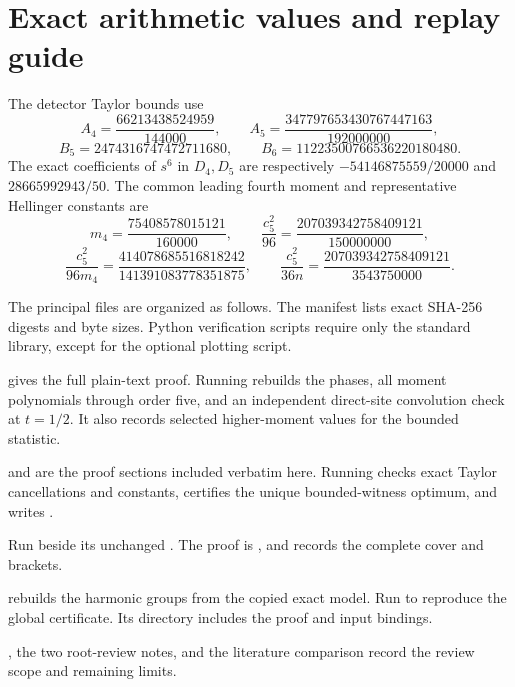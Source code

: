 \documentclass[11pt]{article}
\begin{document}
\appendix
\section{Exact arithmetic values and replay guide}

The detector Taylor bounds use
\[
 A_4=\frac{66213438524959}{144000},\qquad
 A_5=\frac{347797653430767447163}{192000000},
\]
\[
 B_5=2474316747472711680,\qquad
 B_6=11223500766536220180480.
\]
The exact coefficients of $s^6$ in $D_4,D_5$ are respectively
$-54146875559/20000$ and $28665992943/50$.
The common leading fourth moment and representative Hellinger constants are
\[
 m_4=\frac{75408578015121}{160000},\qquad
 \frac{c_5^2}{96}=\frac{207039342758409121}{150000000},
\]
\[
 \frac{c_5^2}{96m_4}=\frac{414078685516818242}{141391083778351875},\qquad
 \frac{c_5^2}{36n}=\frac{207039342758409121}{3543750000}.
\]

The principal files are organized as follows. The manifest lists exact
SHA-256 digests and byte sizes. Python verification scripts require only
the standard library, except for the optional plotting script.
\begin{description}\raggedright
\item[Homogeneous theorem.]
 gives the full
plain-text proof. Running 
rebuilds the phases, all moment polynomials through order five, and an
independent direct-site convolution check at $t=1/2$. It also records
selected higher-moment values for the bounded statistic.
\item[Detectors and optimization.]
 and  are the
proof sections included verbatim here.
Running  checks exact Taylor
cancellations and constants, certifies the unique bounded-witness optimum,
and writes .
\item[Original and marginal-preserving roots.]
Run  beside its unchanged
. The proof is , and
 records the complete cover and brackets.
\item[Harmonic root.]
 rebuilds the harmonic
groups from the copied exact model. Run
 to reproduce the
global certificate. Its directory includes the proof and input bindings.
\item[Internal review and prior work.]
, the two root-review notes, and
the literature comparison record the review scope and remaining limits.
\end{description}
\end{document}
